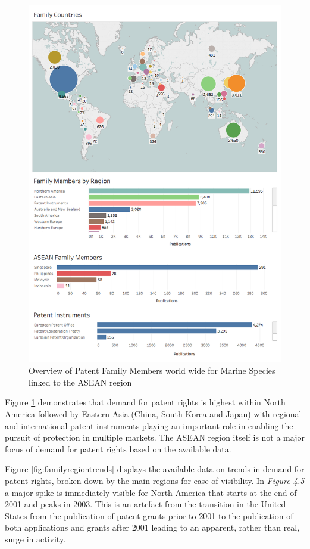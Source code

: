 \documentclass[]{book}
\theoremstyle{definition}
\theoremstyle{definition}
\theoremstyle{definition}
\theoremstyle{remark}
\begin{document}
\begin{figure}

{\centering \includegraphics[width=1\linewidth]{images-patents/families} 

}

\caption{Overview of Patent Family Members world wide for Marine Species linked to the ASEAN region}\label{fig:families}
\end{figure}

Figure \ref{fig:families} demonstrates that demand for patent rights is
highest within North America followed by Eastern Asia (China, South
Korea and Japan) with regional and international patent instruments
playing an important role in enabling the pursuit of protection in
multiple markets. The ASEAN region itself is not a major focus of demand
for patent rights based on the available data.

Figure \ref{fig:familyregiontrends} displays the available data on
trends in demand for patent rights, broken down by the main regions for
ease of visibility. In \emph{Figure 4.5} a major spike is immediately
visible for North America that starts at the end of 2001 and peaks in
2003. This is an artefact from the transition in the United States from
the publication of patent grants prior to 2001 to the publication of
both applications and grants after 2001 leading to an apparent, rather
than real, surge in activity.
\end{document}
